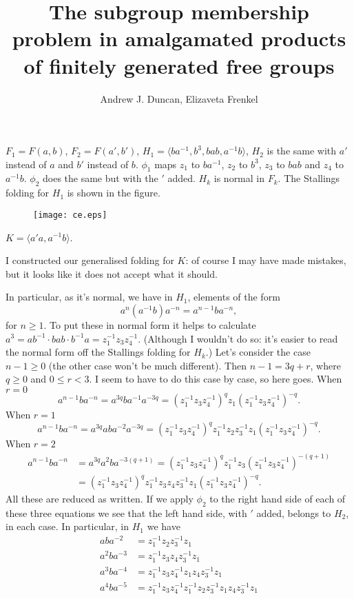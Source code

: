 \documentclass[a4paper,12pt]{article}
\title{The subgroup membership problem in amalgamated products of 
finitely generated free groups
}
\author{Andrew J. Duncan, Elizaveta Frenkel}
\numberwithin{equation}{section}
\numberwithin{figure}{section}
\newcommand{\la}{\langle}
\newcommand{\ra}{\rangle}
\begin{document}
$F_1=F( a,b)$, $F_2=F(a', b')$, $H_1=\la ba^{-1}, b^3, bab,
a^{-1}b\ra$, $H_2$ is the same with $a'$ instead of $a$ and $b'$ instead
of $b$. $\phi_1$ maps $z_1$ to $  ba^{-1}$, $z_2$ to $b^3$, $z_3$ to 
 $bab$ and $z_4$ to $a^{-1}b$. $\phi_2$ does the same but 
with the $'$ added. $H_k$ is normal in $F_k$.
The Stallings folding for $H_1$ is shown in the figure.
\begin{figure}
\begin{center}
\texttt{[image: ce.eps]}
\end{center}
\end{figure}

$K=\la a'a,a^{-1}b\ra$. 


I constructed our generalised 
folding for $K$: of course I may have made mistakes, but it
looks like it does not accept what it should. 

In particular, as it's normal, we have
in $H_1$, elements of the form
\[
a^n (a^{-1}b)a^{-n} = a^{n-1}ba^{-n},\]
for $n\ge 1$.
To put these in normal form it helps to calculate 
$a^3=
ab^{-1}\cdot bab\cdot b^{-1}a=z_1^{-1}z_3z_4^{-1}$.
(Although I wouldn't do so: it's easier to read the normal form off the Stallings folding 
for $H_k$.)
Let's consider the case $n-1\ge 0$ (the other case won't be much different).
Then $n-1=3q+r$, where $q\ge 0$ and $0\le r<3$. I seem to have to 
do this case by case, so here goes. When $r=0$
\[a^{n-1}ba^{-n}=a^{3q}ba^{-1}a^{-3q}=(z_1^{-1}z_3z_4^{-1})^q z_1 (z_1^{-1}z_3z_4^{-1})^{-q}.\]
 When $r=1$ 
\[
a^{n-1}ba^{-n}=a^{3q}aba^{-2}a^{-3q}=(z_1^{-1}z_3z_4^{-1})^q z_1^{-1}z_2 z_3^{-1}z_1
(z_1^{-1}z_3z_4^{-1})^{-q}.
\]
When $r=2$
\begin{align*}
a^{n-1}ba^{-n}&=a^{3q}a^2ba^{-3(q+1)}=(z_1^{-1}z_3z_4^{-1})^q z_1^{-1}z_3 
(z_1^{-1}z_3z_4^{-1})^{-(q+1)}\\&=(z_1^{-1}z_3z_4^{-1})^q z_1^{-1}z_3z_4z_3^{-1}z_1 
(z_1^{-1}z_3z_4^{-1})^{-q}.
\end{align*}
All these are reduced as written. 
If we apply $\phi_2$ to the right hand side of each of these three equations we see that 
the left hand side, with $'$ added, belongs to $H_2$, in each case. 
In particular, in $H_1$ we have 
\begin{align*}
aba^{-2}&=z_1^{-1}z_2z_3^{-1}z_1\\
a^2ba^{-3}&= z_1^{-1}z_3z_4z_3^{-1}z_1\\
a^3ba^{-4}&=  z_1^{-1}z_3z_4^{-1}z_1z_4z_3^{-1}z_1\\
a^4ba^{-5}&= z_1^{-1}z_3z_4^{-1}z_1^{-1}z_2z_3^{-1}z_1z_4z_3^{-1}z_1
\end{align*}
\end{document}
